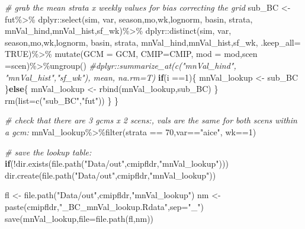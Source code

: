 \documentclass[
]{article}
\newenvironment{Shaded}{\begin{snugshade}}{\end{snugshade}}
\newcommand{\AttributeTok}[1]{\textcolor[rgb]{0.77,0.63,0.00}{#1}}
\newcommand{\CommentTok}[1]{\textcolor[rgb]{0.56,0.35,0.01}{\textit{#1}}}
\newcommand{\ConstantTok}[1]{\textcolor[rgb]{0.00,0.00,0.00}{#1}}
\newcommand{\ControlFlowTok}[1]{\textcolor[rgb]{0.13,0.29,0.53}{\textbf{#1}}}
\newcommand{\DecValTok}[1]{\textcolor[rgb]{0.00,0.00,0.81}{#1}}
\newcommand{\FunctionTok}[1]{\textcolor[rgb]{0.00,0.00,0.00}{#1}}
\newcommand{\NormalTok}[1]{#1}
\newcommand{\OtherTok}[1]{\textcolor[rgb]{0.56,0.35,0.01}{#1}}
\newcommand{\SpecialCharTok}[1]{\textcolor[rgb]{0.00,0.00,0.00}{#1}}
\newcommand{\StringTok}[1]{\textcolor[rgb]{0.31,0.60,0.02}{#1}}
\begin{document}
\begin{Shaded}
\begin{Highlighting}[]
   \CommentTok{\# grab the mean strata x weekly values for bias correcting the grid}
\NormalTok{  sub\_BC }\OtherTok{\textless{}{-}}\NormalTok{ fut}\SpecialCharTok{\%\textgreater{}\%}
\NormalTok{    dplyr}\SpecialCharTok{::}\FunctionTok{select}\NormalTok{(sim, var,  season,mo,wk,lognorm, basin, strata, mnVal\_hind,mnVal\_hist,sf\_wk)}\SpecialCharTok{\%\textgreater{}\%}
\NormalTok{    dplyr}\SpecialCharTok{::}\FunctionTok{distinct}\NormalTok{(sim, var, season,mo,wk,lognorm, basin, strata, mnVal\_hind,mnVal\_hist,sf\_wk, }\AttributeTok{.keep\_all=} \ConstantTok{TRUE}\NormalTok{)}\SpecialCharTok{\%\textgreater{}\%}
    \FunctionTok{mutate}\NormalTok{(}\AttributeTok{GCM =}\NormalTok{ GCM, }\AttributeTok{CMIP=}\NormalTok{CMIP, }\AttributeTok{mod =}\NormalTok{ mod,}\AttributeTok{scen =}\NormalTok{scen)}\SpecialCharTok{\%\textgreater{}\%}\FunctionTok{ungroup}\NormalTok{()}
   \CommentTok{\#dplyr::summarize\_at(c("mnVal\_hind", "mnVal\_hist","sf\_wk"), mean, na.rm=T)}
   \ControlFlowTok{if}\NormalTok{(i }\SpecialCharTok{==}\DecValTok{1}\NormalTok{)\{}
\NormalTok{     mnVal\_lookup }\OtherTok{\textless{}{-}}\NormalTok{ sub\_BC}
\NormalTok{   \}}\ControlFlowTok{else}\NormalTok{\{}
\NormalTok{     mnVal\_lookup }\OtherTok{\textless{}{-}} \FunctionTok{rbind}\NormalTok{(mnVal\_lookup,sub\_BC)}
\NormalTok{   \}}
    \FunctionTok{rm}\NormalTok{(}\AttributeTok{list=}\FunctionTok{c}\NormalTok{(}\StringTok{"sub\_BC"}\NormalTok{,}\StringTok{"fut"}\NormalTok{))}
\NormalTok{  \}}
\NormalTok{\}}
  
  \CommentTok{\# check that there are 3 gcms x 2 scens:, vals are the same for both scens within a gcm:}
\NormalTok{    mnVal\_lookup}\SpecialCharTok{\%\textgreater{}\%}\FunctionTok{filter}\NormalTok{(strata }\SpecialCharTok{==} \DecValTok{70}\NormalTok{,var}\SpecialCharTok{==}\StringTok{"aice"}\NormalTok{, wk}\SpecialCharTok{==}\DecValTok{1}\NormalTok{)}

 
  \CommentTok{\# save the lookup table:}
  \ControlFlowTok{if}\NormalTok{(}\SpecialCharTok{!}\FunctionTok{dir.exists}\NormalTok{(}\FunctionTok{file.path}\NormalTok{(}\StringTok{"Data/out"}\NormalTok{,cmipfldr,}\StringTok{"mnVal\_lookup"}\NormalTok{)))}
   \FunctionTok{dir.create}\NormalTok{(}\FunctionTok{file.path}\NormalTok{(}\StringTok{"Data/out"}\NormalTok{,cmipfldr,}\StringTok{"mnVal\_lookup"}\NormalTok{))}
    
\NormalTok{   fl }\OtherTok{\textless{}{-}} \FunctionTok{file.path}\NormalTok{(}\StringTok{"Data/out"}\NormalTok{,cmipfldr,}\StringTok{"mnVal\_lookup"}\NormalTok{)}
\NormalTok{   nm }\OtherTok{\textless{}{-}} \FunctionTok{paste}\NormalTok{(cmipfldr,}\StringTok{"\_BC\_mnVal\_lookup.Rdata"}\NormalTok{,}\AttributeTok{sep=}\StringTok{"\_"}\NormalTok{)}
   \FunctionTok{save}\NormalTok{(mnVal\_lookup,}\AttributeTok{file=}\FunctionTok{file.path}\NormalTok{(fl,nm))}
   

\end{Highlighting}
\end{Shaded}
\end{document}
